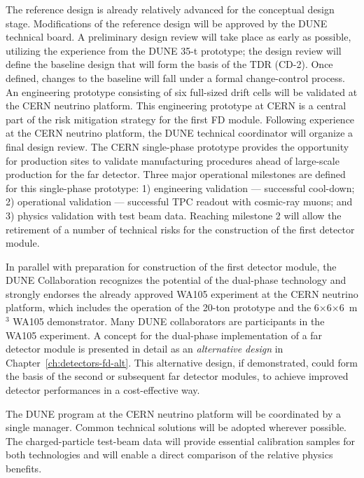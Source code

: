 The reference design is already relatively advanced for  the 
conceptual design
stage. Modifications of the reference design will
be approved by the DUNE technical board. A preliminary design
review will take place as early as possible, utilizing the experience
from the DUNE 35-t prototype; the design review will define the
baseline design that will form the basis of the TDR (CD-2).  Once
defined, changes to the baseline will fall under a formal
change-control process. An engineering prototype consisting of
six full-sized drift cells will be validated at the CERN neutrino
platform.  This engineering
prototype at CERN is a central part of the risk mitigation strategy
for the first  FD module. Following experience at the CERN
neutrino platform, the DUNE technical coordinator will organize a
final design review. The CERN single-phase prototype provides the opportunity for
production sites to validate manufacturing procedures ahead of
large-scale production for the far detector. Three major operational
milestones are defined for this single-phase prototype: 1) engineering
validation --- successful cool-down; 2) operational validation ---
successful TPC readout with cosmic-ray muons; and 3) physics
validation with test beam data. Reaching milestone 2 will allow the
retirement of a number of technical risks for the construction of the
first  detector module.

In parallel with preparation for construction of the first 
detector module, the DUNE Collaboration recognizes the potential of
the dual-phase technology and strongly endorses the already
approved WA105 experiment
 at the CERN neutrino platform, which
includes the operation of the 20-ton prototype and the
6$\times$6$\times$6~m$^3$ WA105 demonstrator. 
Many DUNE collaborators are participants in the WA105
experiment. A concept for the dual-phase implementation of a far detector module
is presented in detail as an \textit{alternative design} in
Chapter~\ref{ch:detectors-fd-alt}. This alternative design, if
demonstrated, could form the basis of the second or subsequent 
far detector modules, to achieve improved detector performances in a
cost-effective way.

The DUNE program at the CERN neutrino platform will be coordinated by
a single manager. Common technical solutions will be adopted
wherever possible.  The charged-particle test-beam data will provide
essential calibration samples for both technologies and will enable a
direct comparison of the relative physics benefits.

